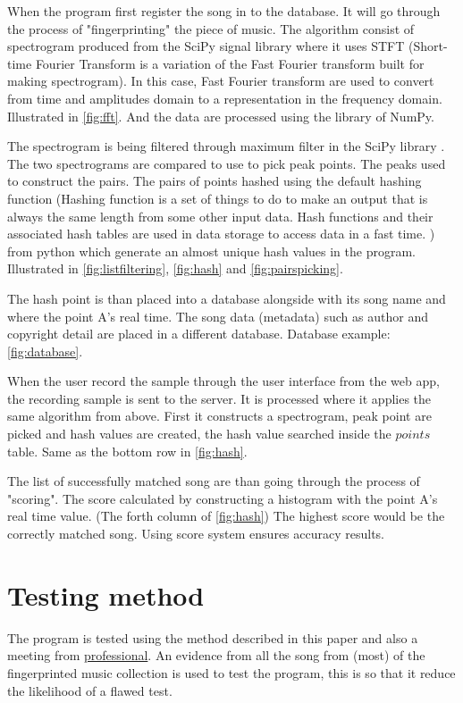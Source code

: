 When the program first register the song in to the database. It will go through the process of "fingerprinting" the piece of music. The algorithm consist of spectrogram produced from the SciPy signal library \cite{virtanen_scipy_2020} where it uses STFT (Short-time Fourier Transform is a variation of the Fast Fourier transform built for making spectrogram). In this case, Fast Fourier transform are used to convert from time and amplitudes domain to a representation in the frequency domain. Illustrated in \autoref{fig:fft}. \cite{noauthor_fast_2025} And the data are processed using the library of NumPy. \cite{harris_array_2020}

The spectrogram is being filtered through maximum filter in the SciPy library \cite{virtanen_scipy_2020}. The two spectrograms are compared to use to pick peak points. The peaks used to construct the pairs.  The pairs of points hashed using the default hashing function (Hashing function is a set of things to do to make an output that is always the same length from some other input data. Hash functions and their associated hash tables are used in data storage to access data in a fast time. \cite{noauthor_hash_2024}) from python which generate an almost unique hash values in the program.  Illustrated in \autoref{fig:listfiltering}, \autoref{fig:hash} and \autoref{fig:pairspicking}.

The hash point is than placed into a database alongside with its song name and where the point A's real time. The song data (metadata) such as author and copyright detail are placed in a different database. Database example: \autoref{fig:database}.

When the user record the sample through the user interface from the web app, the recording sample is sent to the server. It is processed where it applies the same algorithm from above. First it constructs a spectrogram, peak point are picked and hash values are created, the hash value searched inside the $points$ table. Same as the bottom row in \autoref{fig:hash}.

The list of successfully matched song are than going through the process of "scoring". The score calculated by constructing a histogram with the point A's real time value. (The forth column of \autoref{fig:hash}) The highest score would be the correctly matched song. Using score system ensures accuracy results. \cite{wang_systems_2013,macleod_abracadabra_nodate,yang_music_2001}
\chapter{Testing method}
The program is tested using the method described in this paper \cite{yang_music_2001} and also a meeting from \hyperref[meeting:2]{professional}. An evidence from all the song from (most) of the fingerprinted music collection is used to test the program, this is so that it reduce the likelihood of a flawed test. 


